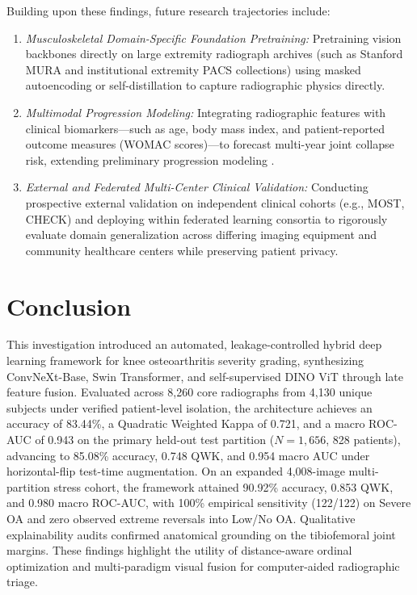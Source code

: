 \documentclass[10pt,journal]{IEEEtran}
\begin{document}
Building upon these findings, future research trajectories include:
\begin{enumerate}[leftmargin=*]
\item \textit{Musculoskeletal Domain-Specific Foundation Pretraining:} Pretraining vision backbones directly on large extremity radiograph archives (such as Stanford MURA and institutional extremity PACS collections) using masked autoencoding or self-distillation to capture radiographic physics directly.
\item \textit{Multimodal Progression Modeling:} Integrating radiographic features with clinical biomarkers---such as age, body mass index, and patient-reported outcome measures (WOMAC scores)---to forecast multi-year joint collapse risk, extending preliminary progression modeling \cite{guan2022deep}.
\item \textit{External and Federated Multi-Center Clinical Validation:} Conducting prospective external validation on independent clinical cohorts (e.g., MOST, CHECK) and deploying within federated learning consortia to rigorously evaluate domain generalization across differing imaging equipment and community healthcare centers while preserving patient privacy.
\end{enumerate}


\section{Conclusion}
\label{sec:conclusion}

This investigation introduced an automated, leakage-controlled hybrid deep learning framework for knee osteoarthritis severity grading, synthesizing ConvNeXt-Base, Swin Transformer, and self-supervised DINO ViT through late feature fusion. Evaluated across 8,260 core radiographs from 4,130 unique subjects under verified patient-level isolation, the architecture achieves an accuracy of 83.44\%, a Quadratic Weighted Kappa of 0.721, and a macro ROC-AUC of 0.943 on the primary held-out test partition ($N = 1{,}656$, 828 patients), advancing to 85.08\% accuracy, 0.748 QWK, and 0.954 macro AUC under horizontal-flip test-time augmentation. On an expanded 4,008-image multi-partition stress cohort, the framework attained 90.92\% accuracy, 0.853 QWK, and 0.980 macro ROC-AUC, with 100\% empirical sensitivity (122/122) on Severe OA and zero observed extreme reversals into Low/No OA. Qualitative explainability audits confirmed anatomical grounding on the tibiofemoral joint margins. These findings highlight the utility of distance-aware ordinal optimization and multi-paradigm visual fusion for computer-aided radiographic triage.
\end{document}

